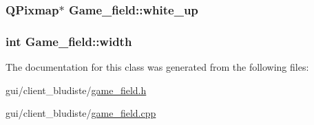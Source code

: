 \hypertarget{classGame__field_af81b72dc5a1da7aae4929bdd43c449bd}{
\subsubsection[{white\-\_\-up}]{\setlength{\rightskip}{0pt plus 5cm}Q\-Pixmap$\ast$ Game\-\_\-field\-::white\-\_\-up}}\label{classGame__field_af81b72dc5a1da7aae4929bdd43c449bd}
\hypertarget{classGame__field_aded6e31a0afaf905171e2a4b06a52e29}{
\subsubsection[{width}]{\setlength{\rightskip}{0pt plus 5cm}int Game\-\_\-field\-::width}}\label{classGame__field_aded6e31a0afaf905171e2a4b06a52e29}


The documentation for this class was generated from the following files\-:\begin{DoxyCompactItemize}
\item 
gui/client\-\_\-bludiste/\hyperlink{game__field_8h}{game\-\_\-field.\-h}\item 
gui/client\-\_\-bludiste/\hyperlink{game__field_8cpp}{game\-\_\-field.\-cpp}\end{DoxyCompactItemize}
